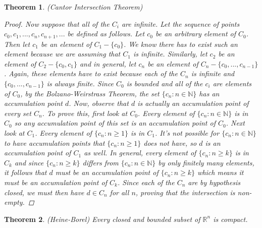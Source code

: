 \documentclass[11pt,a4paper]{report}
\theoremstyle{plain}
\newtheorem{thm}{Theorem}[section]
\theoremstyle{definition}
\theoremstyle{remark}
\begin{document}
\begin{thm}{(Cantor Intersection Theorem)}
\begin{proof}
Now suppose that all of the $C_i$ are infinite. Let the sequence of points $c_0, c_1, ..., c_n, c_{n+1}, ...$ be defined as follows.  Let $c_0$ be an arbitrary element of $C_0$.  Then let $c_1$ be an element of $C_1 - \{c_0\}$.  We know there has to exist such an element because we are assuming that $C_1$ is infinite.  Similarly, let $c_2$ be an element of $C_2 - \{c_0, c_1\}$ and in general, let $c_n$ be an element of $C_n - \{c_0, ... , c_{n-1}\}$.  Again, these elements have to exist because each of the $C_n$ is infinite and $\{c_0, ... , c_{n-1}\}$ is always finite. Since $C_0$ is bounded and all of the $c_i$ are elements of $C_0$, by the Bolzano-Weirstrass Theorem, the set $\{c_n \colon n \in \mathbb{N} \}$ has an accumulation point $d$. Now, observe that $d$ is actually an accumulation point of \textit{every} set $C_n$.  To prove this, first look at $C_0$. Every element of $\{c_n \colon n \in \mathbb{N} \}$ is in $C_0$ so any accumulation point of this set is an accumulation point of $C_0$.  Next look at $C_1$. Every element of $\{c_n \colon n \geq 1 \}$ is in $C_1$.  It's not possible for $\{c_n \colon n \in \mathbb{N} \}$ to have accumulation points that $\{c_n \colon n \geq 1 \}$ does not have, so $d$ is an accumulation point of $C_1$ as well.  In general, every element of $\{c_n \colon n \geq k \}$ is in $C_k$ and since $\{c_n \colon n \geq k \}$ differs from $\{c_n \colon n \in \mathbb{N} \}$ by only finitely many elements, it follows that $d$ must be an accumulation point of $\{c_n \colon n \geq k  \}$ which means it must be an accumulation point of $C_k$. Since each of the $C_n$ are by hypothesis closed, we must then have $d \in C_n$ for all $n$, proving that the intersection is non-empty.
\end{proof}
\end{thm}
\begin{thm}{(Heine-Borel)}
Every closed and bounded subset of $\mathbb{R}^n$ is compact.
\end{thm}
\end{document}

